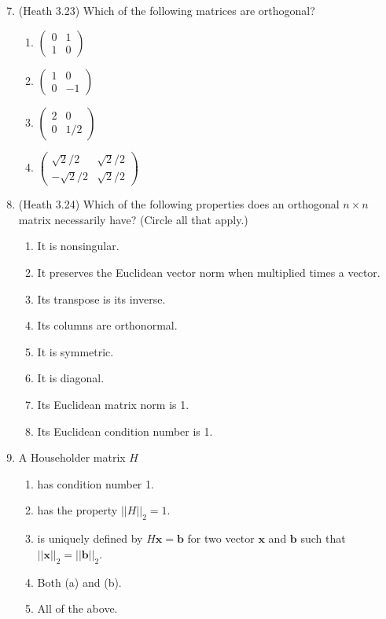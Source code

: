 \documentclass{article}
\renewcommand{\vec}[1]{\mathbf{#1}}
\newcommand{\x}{\vec{x}}
\renewcommand{\b}{\vec{b}}
\begin{document}
\begin{enumerate}
\setcounter{enumi}{6}

\item (Heath 3.23) Which of the following matrices are orthogonal?
\begin{enumerate}
\item $\begin{pmatrix} 0 & 1 \\ 1 & 0 \end{pmatrix}$ \Large \checkmark \normalsize
\item $\begin{pmatrix} 1 & 0 \\ 0 & -1 \end{pmatrix}$ \Large \checkmark \normalsize
\item $\begin{pmatrix} 2 & 0 \\ 0 & 1/2 \end{pmatrix}$
\item $\begin{pmatrix} \sqrt{2}/2 & \sqrt{2}/2 \\ -\sqrt{2}/2 & \sqrt{2}/2 \end{pmatrix}$ \Large \checkmark \normalsize
\end{enumerate}

\item (Heath 3.24) Which of the following properties does an orthogonal $n \times n$ matrix necessarily have? (Circle all that apply.)
\begin{enumerate}
\item It is nonsingular. \Large \checkmark \normalsize
\item It preserves the Euclidean vector norm when multiplied times a vector. \Large \checkmark \normalsize
\item Its transpose is its inverse. \Large \checkmark \normalsize
\item Its columns are orthonormal. \Large \checkmark \normalsize
\item It is symmetric.
\item It is diagonal.
\item Its Euclidean matrix norm is 1. \Large \checkmark \normalsize
\item Its Euclidean condition number is 1. \Large \checkmark \normalsize
\end{enumerate}

\item A Householder matrix $H$
\begin{enumerate}
\item has condition number 1.
\item has the property $||H||_2 = 1$.
\item is uniquely defined by $H\x = \b$ for two vector $\x$ and $\b$ such that  $||\x||_2 = ||\b||_2$.
\item Both (a) and (b).
\item All of the above. \Large \checkmark \normalsize
\end{enumerate}


\end{enumerate}
\end{document}
